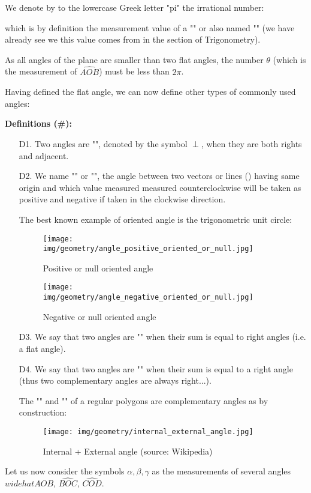 	We denote by to the lowercase Greek letter "pi" the irrational number:
	
	which is by definition the measurement value of a "" or also named "" (we have already see we this value comes from in the section of Trigonometry).
	\begin{tcolorbox}[title=Remark,colframe=black,arc=10pt]
	As all angles of the plane are smaller than two flat angles, the number $\theta$ (which is the measurement of $\widehat{AOB}$) must be less than $2\pi$.
	\end{tcolorbox}
	Having defined the flat angle, we can now define other types of commonly used angles:
	
	\textbf{Definitions (\#\mydef):}
	\begin{enumerate}
		\item[D1.] Two angles are "", denoted by the symbol $\perp$, when they are both rights and adjacent.

		\item[D2.] We name "" or "", the angle between two vectors or lines () having same origin and which value measured measured counterclockwise will be taken as positive and negative if taken in the clockwise direction.
		
		The best known example of oriented angle is the trigonometric unit circle:
		\begin{figure}[H]
			\centering
			\texttt{[image: img/geometry/angle\_positive\_oriented\_or\_null.jpg]}
			\caption{Positive or null oriented angle}
		\end{figure}
		\begin{figure}[H]
			\centering
			\texttt{[image: img/geometry/angle\_negative\_oriented\_or\_null.jpg]}
			\caption{Negative or null oriented angle}
		\end{figure}
		
		\item[D3.] We say that two angles are "" when their sum is equal to right angles (i.e. a flat angle).

		\item[D4.] We say that two angles are "" when their sum is equal to a right angle (thus two complementary angles are always right...).
		
		The "" and "" of a regular polygons are complementary angles as by construction:
		\begin{figure}[H]
			\centering
			\texttt{[image: img/geometry/internal\_external\_angle.jpg]}
			\caption{Internal + External angle (source: Wikipedia)}
		\end{figure}
		
	\end{enumerate}
	Let us now consider the symbols $\alpha,\beta,\gamma$ as the measurements of several angles $widehat{AOB}$, $\widehat{BOC}$, $\widehat{COD}$.


